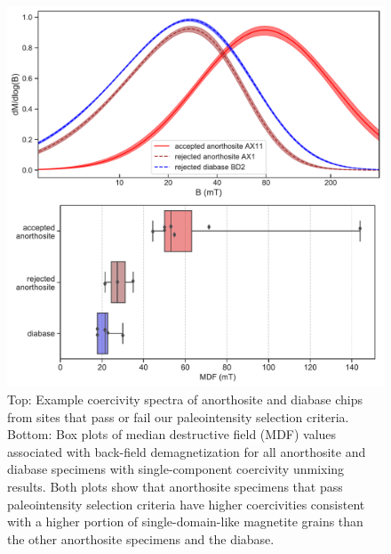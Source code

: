 \documentclass[9pt,twocolumn,twoside,lineno]{pnas-new}
\begin{document}
\begin{figure}
\noindent\includegraphics[width=\linewidth]{coercivity.pdf}
\centering
\caption{\footnotesize{Top: Example coercivity spectra of anorthosite and diabase chips from sites that pass or fail our paleointensity selection criteria. Bottom: Box plots of median destructive field (MDF) values associated with back-field demagnetization for all anorthosite and diabase specimens with single-component coercivity unmixing results. Both plots show that anorthosite specimens that pass paleointensity selection criteria have higher coercivities consistent with a higher portion of single-domain-like magnetite grains than the other anorthosite specimens and the diabase.}}
\label{fig:coercivity}
\end{figure}
\end{document}
